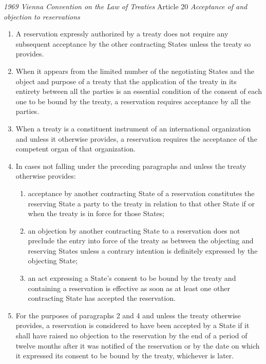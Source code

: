 \begin{conventiondetails}{\textit{1969 Vienna Convention on the Law of Treaties} Article 20}\label{VCLT Art 20}
    \flushleft
    \textit{Acceptance of and objection to reservations}

    \begin{enumerate}
        \item A reservation expressly authorized by a treaty does not require any subsequent acceptance by  the other contracting States unless the treaty so provides. 
        \item When it appears from the limited number of the negotiating States and the object and purpose of a treaty that the application of the treaty in its entirety between all the parties is an essential condition of the consent of each one to be bound by the treaty, a reservation requires acceptance by all the parties. 
        \item When a treaty is a constituent instrument of an international organization and unless it otherwise provides, a reservation requires the acceptance of the competent organ of that organization. 
        \item In cases not falling under the preceding paragraphs and unless the treaty otherwise provides:   
        \begin{enumerate}[label=(\alph*)]
            \item acceptance by another contracting State of a reservation constitutes the reserving State a party to the treaty in relation to that other State if or when the treaty is in force for those States; 
            \item an objection by another contracting State to a reservation does not preclude the entry into force of the treaty as between the objecting and reserving States unless a contrary intention is definitely expressed by the objecting State; 
            \item an act expressing a State's consent to be bound by the treaty and containing a reservation is effective as soon as at least one other contracting State has accepted the reservation.
        \end{enumerate}     
        \item For the purposes of paragraphs 2 and 4 and unless the treaty otherwise provides, a reservation is considered to have been accepted by a State if it shall have raised no objection to the reservation by the end of a period of twelve months after it was notified of the reservation or by the date on which it expressed its consent to be bound by the treaty, whichever is later. 
    \end{enumerate}
\end{conventiondetails}

